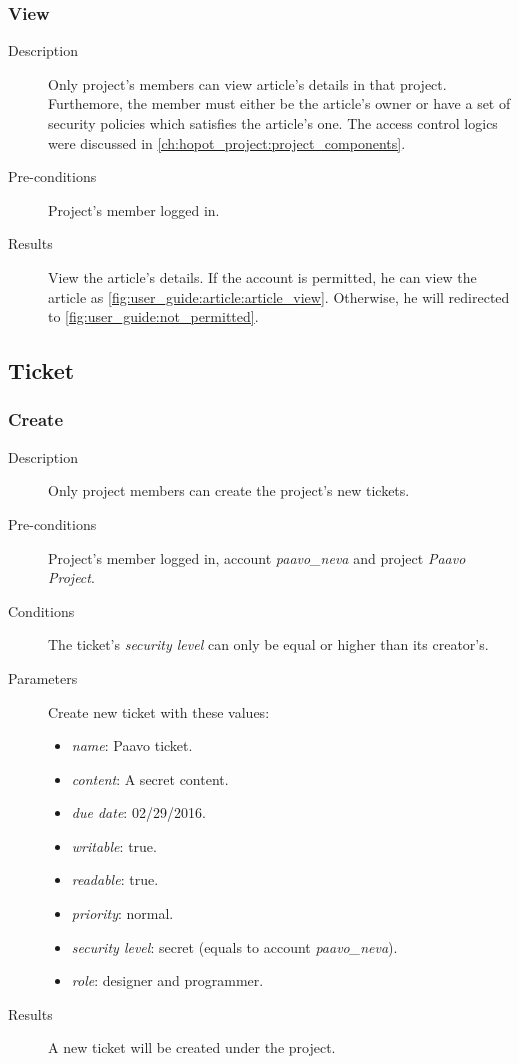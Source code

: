 \clearpage

\subsubsection{View}
\label{ch:result:user_guide:article:list}

\begin{description}
\item[Description] Only project's members can view article's details in that project.
Furthemore, the member must either be the article's owner or have a set of security policies which satisfies the article's one.
The access control logics were discussed in \autoref{ch:hopot_project:project_components}.
\item[Pre-conditions] Project's member logged in.
\item[Results] View the article's details.
If the account is permitted, he can view the article as \autoref{fig:user_guide:article:article_view}.
Otherwise, he will redirected to \autoref{fig:user_guide:not_permitted}.
\end{description}

\subsection{Ticket}
\label{ch:result:user_guide:ticket}
\subsubsection{Create}
\label{ch:result:user_guide:ticket:create}

\begin{description}
\item[Description] Only project members can create the project's new tickets.
\item[Pre-conditions] Project's member logged in, \eg account \emph{paavo\_neva} and project \emph{Paavo Project}.
\item[Conditions] The ticket's \emph{security level} can only be equal or higher than its creator's.
\item[Parameters] Create new ticket with these values:
\begin{itemize}
\item \emph{name}: Paavo ticket.
\item \emph{content}: A secret content.
\item \emph{due date}: 02/29/2016.
\item \emph{writable}: true.
\item \emph{readable}: true.
\item \emph{priority}: normal.
\item \emph{security level}: secret (equals to account \emph{paavo\_neva}).
\item \emph{role}: designer and programmer.
\end{itemize}
\item[Results] A new ticket will be created under the project.
\end{description}

